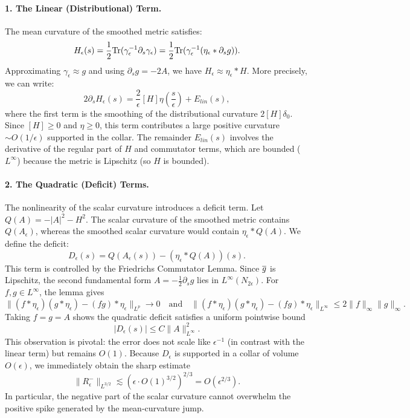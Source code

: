 \paragraph{1. The Linear (Distributional) Term.}
The mean curvature of the smoothed metric satisfies:
\[ H_\epsilon(s) = \frac{1}{2} \mathrm{Tr}(\gamma_\epsilon^{-1} \partial_s \gamma_\epsilon) = \frac{1}{2} \mathrm{Tr}(\gamma_\epsilon^{-1} (\eta_\epsilon * \partial_s g)). \]
Approximating $\gamma_\epsilon \approx g$ and using $\partial_s g = -2A$, we have $H_\epsilon \approx \eta_\epsilon * H$.
More precisely, we can write:
\[ 2 \partial_s H_\epsilon(s) = \frac{2}{\epsilon} [H] \eta\left(\frac{s}{\epsilon}\right) + E_{lin}(s), \]
where the first term is the smoothing of the distributional curvature $2[H]\delta_0$. Since $[H] \ge 0$ and $\eta \ge 0$, this term contributes a large positive curvature $\sim O(1/\epsilon)$ supported in the collar.
The remainder $E_{lin}(s)$ involves the derivative of the regular part of $H$ and commutator terms, which are bounded ($L^\infty$) because the metric is Lipschitz (so $H$ is bounded).

\paragraph{2. The Quadratic (Deficit) Terms.}
The nonlinearity of the scalar curvature introduces a deficit term. Let $Q(A) = -|A|^2 - H^2$. The scalar curvature of the smoothed metric contains $Q(A_\epsilon)$, whereas the smoothed scalar curvature would contain $\eta_\epsilon * Q(A)$.
We define the deficit:
\begin{equation}
    D_\epsilon(s) = Q(A_\epsilon(s)) - (\eta_\epsilon * Q(A))(s).
\end{equation}
This term is controlled by the Friedrichs Commutator Lemma. Since $\overline{g}$ is Lipschitz, the second fundamental form $A = -\tfrac12 \partial_s g$ lies in $L^\infty(N_{2\epsilon})$. For $f,g \in L^\infty$, the lemma gives
\[ \| (f * \eta_\epsilon)(g * \eta_\epsilon) - (fg) * \eta_\epsilon \|_{L^p} \to 0 \quad \text{and} \quad \| (f * \eta_\epsilon)(g * \eta_\epsilon) - (fg) * \eta_\epsilon \|_{L^\infty} \le 2\|f\|_\infty \|g\|_\infty. \]
Taking $f=g=A$ shows the quadratic deficit satisfies a uniform pointwise bound
\[ |D_\epsilon(s)| \le C \|A\|_{L^\infty}^2. \]
This observation is pivotal: the error does not scale like $\epsilon^{-1}$ (in contrast with the linear term) but remains $O(1)$. Because $D_\epsilon$ is supported in a collar of volume $O(\epsilon)$, we immediately obtain the sharp estimate
\[ \|R^-_\epsilon\|_{L^{3/2}} \lesssim (\epsilon \cdot O(1)^{3/2})^{2/3} = O(\epsilon^{2/3}). \]
In particular, the negative part of the scalar curvature cannot overwhelm the positive spike generated by the mean-curvature jump.

